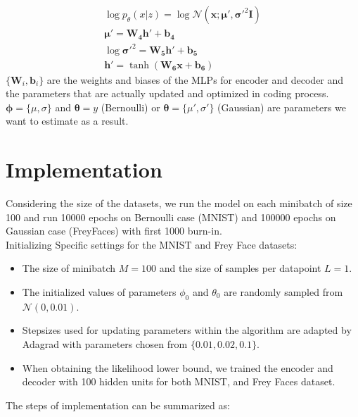 \documentclass[11pt]{article}
\begin{document}
\begin{eqnarray}
\log p_\theta(x|z)=\log\mathcal{N}(\mathbf{x}; \mathbf{\mu}', \mathbf{\sigma}'^2\mathbf{I})\\
\mathbf{\mu}'=\mathbf{W_4h'}+\mathbf{b_4}\\
\log\mathbf{\sigma}'^2=\mathbf{W_5h'}+\mathbf{b_5}\\
\mathbf{h'}=\tanh(\mathbf{W_6x}+\mathbf{b_6})
\end{eqnarray}
\noindent
$\{\mathbf{W}_i, \mathbf{b}_i\}$ are the weights and biases of the MLPs for encoder and decoder and the parameters that are actually updated and optimized in coding process. $\mathbf{\phi}=\{\mu, \sigma\}$ and $\mathbf{\theta}=y$ (Bernoulli) or $\mathbf{\theta}=\{\mu', \sigma'\}$ (Gaussian) are parameters we want to estimate as a result.

\section{Implementation}

\noindent
Considering the size of the datasets, we run the model on each minibatch of size 100 and run 10000 epochs on Bernoulli case (MNIST) and 100000 epochs on Gaussian case (FreyFaces) with first 1000 burn-in. \\

\noindent
Initializing Specific settings for the MNIST and Frey Face datasets: 
\begin{itemize}
\item The size of minibatch $M=100$ and the size of samples per datapoint $L=1$.
\item The initialized values of parameters $\phi_0$ and $\theta_0$ are randomly sampled from $\mathcal{N}(0,0.01)$.
\item Stepsizes used for updating parameters within the algorithm are adapted by Adagrad with parameters chosen from $\{0.01, 0.02, 0.1\}$.
\item When obtaining the likelihood lower bound, we trained the encoder and decoder with 100 hidden units for both MNIST, and Frey Faces dataset.
\end{itemize}

\noindent
The steps of implementation can be summarized as: \\
\\
\end{document}
